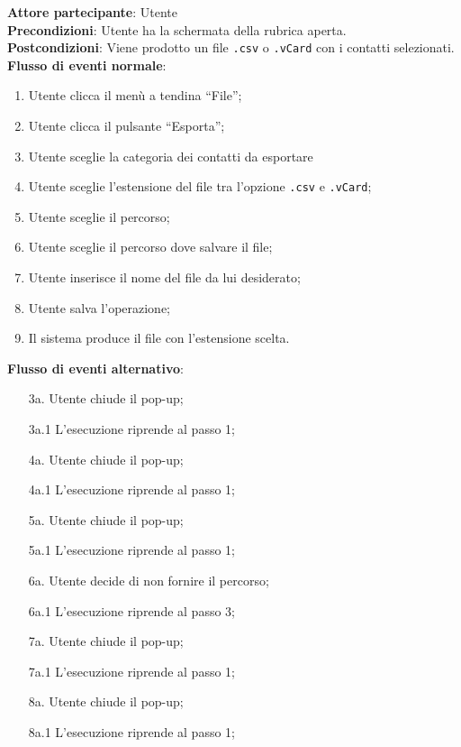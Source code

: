 \begin{tcolorbox}[colback=white,colframe=black!80!white,title=\textbf{C5 - Esportare rubrica}]
	\textbf{Attore partecipante}: Utente
	\\\textbf{Precondizioni}: Utente ha la schermata della rubrica aperta.
	\\\textbf{Postcondizioni}: Viene prodotto un file \texttt{.csv} o \texttt{.vCard} con i contatti selezionati.
	\\\textbf{Flusso di eventi normale}:
	\begin{enumerate}[noitemsep, topsep=0pt]
		\item Utente clicca il menù a tendina “File”;
		\item Utente clicca il pulsante “Esporta”;
		\item Utente sceglie la categoria dei contatti da esportare
		\item Utente sceglie l’estensione del file tra l’opzione \texttt{.csv} e \texttt{.vCard};
		\item Utente sceglie il percorso;
 		\item Utente sceglie il percorso dove salvare il file;
		\item Utente inserisce il nome del file da lui desiderato;
		\item Utente salva l’operazione;
		\item Il sistema produce il file con l’estensione scelta.		
	\end{enumerate}
	\textbf{Flusso di eventi alternativo}:
	\begin{itemize}[noitemsep, topsep=0pt]
		\item[3a. ] Utente chiude il pop-up;
		\item[3a.1] L’esecuzione riprende al passo 1;
		\item[4a. ] Utente chiude il pop-up;
		\item[4a.1] L’esecuzione riprende al passo 1;
		\item[5a. ] Utente chiude il pop-up;
		\item[5a.1] L’esecuzione riprende al passo 1;
		\item[6a. ] Utente decide di non fornire il percorso;
		\item[6a.1] L’esecuzione riprende al passo 3;
		\item[7a. ] Utente chiude il pop-up;
		\item[7a.1] L’esecuzione riprende al passo 1;
		\item[8a. ] Utente chiude il pop-up;
		\item[8a.1] L’esecuzione riprende al passo 1;		
	\end{itemize}
\end{tcolorbox}

